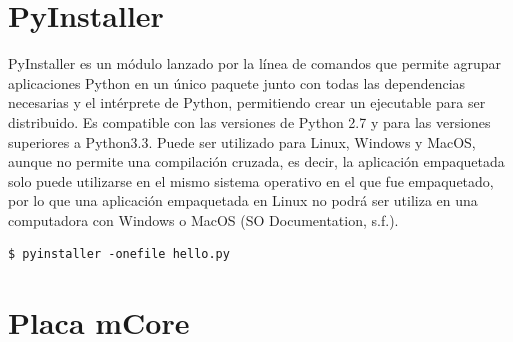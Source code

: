 \documentclass{report}
\begin{document}
\section{PyInstaller}

PyInstaller es un módulo lanzado por la línea de comandos que permite agrupar aplicaciones Python en un único paquete junto con todas las dependencias necesarias y el intérprete de Python, permitiendo crear un ejecutable para ser distribuido. Es compatible con las versiones de Python 2.7 y para las versiones superiores a Python3.3. Puede ser utilizado para Linux, Windows y MacOS, aunque no permite una compilación cruzada, es decir, la aplicación empaquetada solo puede utilizarse en el mismo sistema operativo en el que fue empaquetado, por lo que una aplicación empaquetada en Linux no podrá ser utiliza en una computadora con Windows o MacOS (SO Documentation, s.f.).
\\
\begin{lstlisting}[frame=single,breaklines=true, label=Ejemplo para generar un ejecutable con PyInstaller, caption=Ejemplo para generar un ejecutable con PyInstaller, captionpos=b]
 		   $ pyinstaller -onefile hello.py
\end{lstlisting}

\section{Placa mCore}
\end{document}
